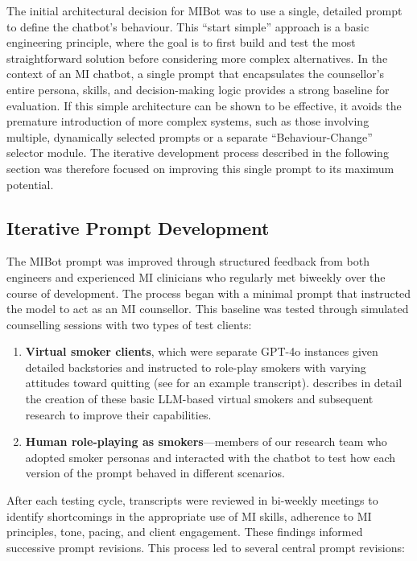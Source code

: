 The initial architectural decision for MIBot was to use a single, detailed prompt to define the chatbot's behaviour. This ``start simple'' approach is a basic engineering principle, where the goal is to first build and test the most straightforward solution before considering more complex alternatives. In the context of an MI chatbot, a single prompt that encapsulates the counsellor's entire persona, skills, and decision-making logic provides a strong baseline for evaluation. If this simple architecture can be shown to be effective, it avoids the premature introduction of more complex systems, such as those involving multiple, dynamically selected prompts or a separate ``Behaviour-Change'' selector module. The iterative development process described in the following section was therefore focused on improving this single prompt to its maximum potential.

\subsection{Iterative Prompt Development}
The MIBot prompt was improved through structured feedback from both engineers and experienced MI clinicians who regularly met biweekly over the course of development. The process began with a minimal prompt that instructed the model to act as an MI counsellor. This baseline was tested through simulated counselling sessions with two types of test clients:

\begin{enumerate}
    \item \textbf{Virtual smoker clients}, which were separate GPT-4o instances given detailed backstories and instructed to role-play smokers with varying attitudes toward quitting (see  for an example transcript).  describes in detail the creation of these basic LLM-based virtual smokers and subsequent research to improve their capabilities.
    \item \textbf{Human role-playing as smokers}---members of our research team who adopted smoker personas and interacted with the chatbot to test how each version of the prompt behaved in different scenarios.
\end{enumerate}

After each testing cycle, transcripts were reviewed in bi-weekly meetings to identify shortcomings in the appropriate use of MI skills, adherence to MI principles, tone, pacing, and client engagement. These findings informed successive prompt revisions.
This process led to several central prompt revisions:


